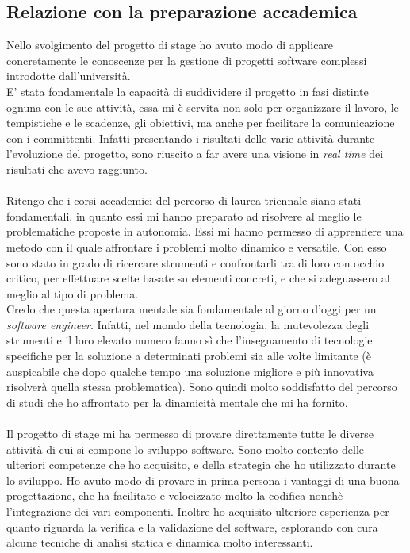 \subsection{Relazione con la preparazione accademica}
Nello svolgimento del progetto di stage ho avuto modo di applicare concretamente le conoscenze per la gestione di progetti software complessi introdotte dall'università. \\
E' stata fondamentale la capacità di suddividere il progetto in fasi distinte ognuna con le sue attività, essa mi è servita non solo per organizzare il lavoro, le tempistiche e le scadenze, gli obiettivi, ma anche per facilitare la comunicazione con i committenti. Infatti presentando i risultati delle varie attività durante l'evoluzione del progetto, sono riuscito a far avere una visione in \textit{real time} dei risultati che avevo raggiunto. \\ \\ 
Ritengo che i corsi accademici del percorso di laurea triennale siano stati fondamentali, in quanto essi mi hanno preparato ad risolvere al meglio le problematiche proposte in autonomia. Essi mi hanno permesso di apprendere una metodo con il quale affrontare i problemi molto dinamico e versatile. Con esso sono stato in grado di ricercare strumenti e confrontarli tra di loro con occhio critico, per effettuare scelte basate su elementi concreti, e che si adeguassero al meglio al tipo di problema. \\
Credo che questa apertura mentale sia fondamentale al giorno d'oggi per un \textit{software engineer}. Infatti, nel mondo della tecnologia, la mutevolezza degli strumenti e il loro elevato numero fanno sì che l'insegnamento di tecnologie specifiche per la soluzione a determinati problemi sia alle volte limitante (è auspicabile che dopo qualche tempo una soluzione migliore e più innovativa risolverà quella stessa problematica). Sono quindi molto soddisfatto del percorso di studi che ho affrontato per la dinamicità mentale che mi ha fornito. \\ \\
Il progetto di stage mi ha permesso di provare direttamente tutte le diverse attività di cui si compone lo sviluppo software. Sono molto contento delle ulteriori competenze che ho acquisito, e della strategia che ho utilizzato durante lo sviluppo. Ho avuto modo di provare in prima persona i vantaggi di una buona progettazione, che ha facilitato e velocizzato molto la codifica nonchè l'integrazione dei vari componenti. Inoltre ho acquisito ulteriore esperienza per quanto riguarda la verifica e la validazione del software, esplorando con cura alcune tecniche di analisi statica e dinamica molto interessanti. \\ \\ 


